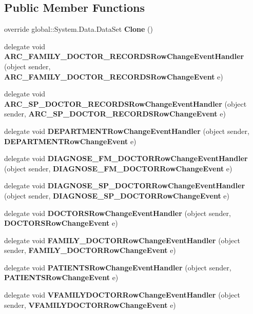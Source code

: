 \subsection*{Public Member Functions}
\begin{CompactItemize}
\item 
override global::System.Data.DataSet \textbf{Clone} ()\label{class_automatic_medical_system_1_1_data_set2_876cf4bc43e23d7e0ff131cfc70849aa}

\item 
delegate void \textbf{ARC\_\-FAMILY\_\-DOCTOR\_\-RECORDSRowChangeEventHandler} (object sender, {\bf ARC\_\-FAMILY\_\-DOCTOR\_\-RECORDSRowChangeEvent} e)\label{class_automatic_medical_system_1_1_data_set2_30ec5b1ee16c33b5c958aeeeab05f79b}

\item 
delegate void \textbf{ARC\_\-SP\_\-DOCTOR\_\-RECORDSRowChangeEventHandler} (object sender, {\bf ARC\_\-SP\_\-DOCTOR\_\-RECORDSRowChangeEvent} e)\label{class_automatic_medical_system_1_1_data_set2_faafaa8db5febf71565476660d436218}

\item 
delegate void \textbf{DEPARTMENTRowChangeEventHandler} (object sender, {\bf DEPARTMENTRowChangeEvent} e)\label{class_automatic_medical_system_1_1_data_set2_8a3cdb1d7c69f8a6c0e83c4eec592e64}

\item 
delegate void \textbf{DIAGNOSE\_\-FM\_\-DOCTORRowChangeEventHandler} (object sender, {\bf DIAGNOSE\_\-FM\_\-DOCTORRowChangeEvent} e)\label{class_automatic_medical_system_1_1_data_set2_4852333eac763ce7f68565b3a4c68c99}

\item 
delegate void \textbf{DIAGNOSE\_\-SP\_\-DOCTORRowChangeEventHandler} (object sender, {\bf DIAGNOSE\_\-SP\_\-DOCTORRowChangeEvent} e)\label{class_automatic_medical_system_1_1_data_set2_111027313bcda31e24baae69369207ba}

\item 
delegate void \textbf{DOCTORSRowChangeEventHandler} (object sender, {\bf DOCTORSRowChangeEvent} e)\label{class_automatic_medical_system_1_1_data_set2_23ccd718263b50261378ce695b7c110f}

\item 
delegate void \textbf{FAMILY\_\-DOCTORRowChangeEventHandler} (object sender, {\bf FAMILY\_\-DOCTORRowChangeEvent} e)\label{class_automatic_medical_system_1_1_data_set2_84a7a2d82b32f288c7b472803dcc501d}

\item 
delegate void \textbf{PATIENTSRowChangeEventHandler} (object sender, {\bf PATIENTSRowChangeEvent} e)\label{class_automatic_medical_system_1_1_data_set2_1971cf86a9b3e9117080093e9e17a738}

\item 
delegate void \textbf{VFAMILYDOCTORRowChangeEventHandler} (object sender, {\bf VFAMILYDOCTORRowChangeEvent} e)\label{class_automatic_medical_system_1_1_data_set2_6545e438b37b9c82ac017695d3d7bbc2}

\end{CompactItemize}
